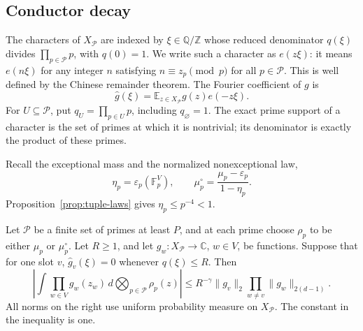 \subsection{Conductor decay}

The characters of \(X_{\mathcal P}\) are indexed by
\(\xi\in\mathbb Q/\mathbb Z\) whose reduced denominator \(q(\xi)\)
divides \(\prod_{p\in\mathcal P}p\), with \(q(0)=1\).  We write
such a character as \(e(z\xi)\): it means \(e(n\xi)\) for any integer
\(n\) satisfying \(n\equiv z_p\pmod p\) for all \(p\in\mathcal P\).
This is well defined by the Chinese remainder theorem.  The Fourier
coefficient of \(g\) is
\[
 \widehat g(\xi)=\mathbb E_{z\in X_{\mathcal P}}g(z)e(-z\xi).
\]
For \(U\subseteq\mathcal P\), put \(q_U=\prod_{p\in U}p\),
including \(q_{\varnothing}=1\).  The exact prime support of a
character is the set of primes at which it is nontrivial; its denominator
is exactly the product of these primes.

Recall the exceptional mass and the normalized nonexceptional law,
\[
 \eta_p=\varepsilon_p(\mathbb F_p^V),
 \qquad
 \mu_p^\circ=\frac{\mu_p-\varepsilon_p}{1-\eta_p}.
\]
Proposition~\ref{prop:tuple-laws} gives \(\eta_p\le p^{-4}<1\).

\begin{lemma}
\label{lem:conductor-decay}
Let \(\mathcal P\) be a finite set of primes at least \(P\), and
at each prime choose \(\rho_p\) to be either \(\mu_p\) or
\(\mu_p^\circ\).  Let \(R\ge1\), and let
\(g_w:X_{\mathcal P}\to\mathbb C\), \(w\in V\), be functions.
Suppose that for one slot \(v\),
\(\widehat g_v(\xi)=0\) whenever \(q(\xi)\le R\).  Then
\begin{equation}
 \left|\int\prod_{w\in V}g_w(z_w)\,
       d\!\bigotimes_{p\in\mathcal P}\rho_p(z)\right|
 \le R^{-\gamma}\|g_v\|_2
        \prod_{w\ne v}\|g_w\|_{2(d-1)}.
 \label{eq:conductor-decay}
\end{equation}
All norms on the right use uniform probability measure on
\(X_{\mathcal P}\).  The constant in the inequality is one.
\end{lemma}

